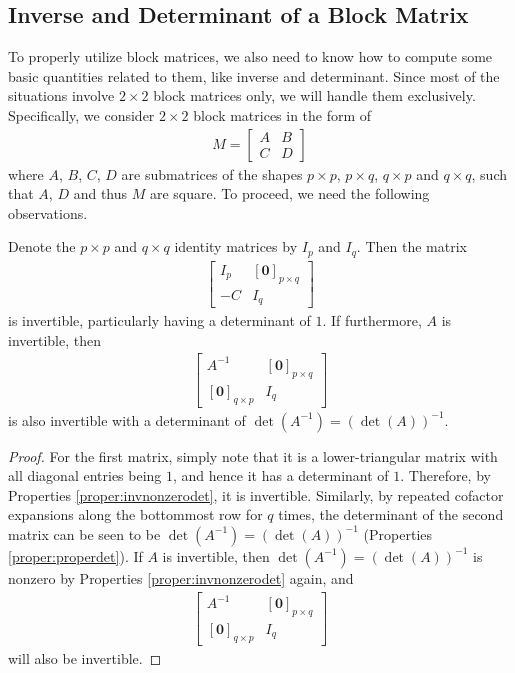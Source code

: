 \subsection{Inverse and Determinant of a Block Matrix}
To properly utilize block matrices, we also need to know how to compute some basic quantities related to them, like inverse and determinant. Since most of the situations involve $2 \times 2$ block matrices only, we will handle them exclusively. Specifically, we consider $2 \times 2$ block matrices in the form of
\begin{align*}
M = \begin{bmatrix}
A & B \\
C & D
\end{bmatrix}
\end{align*}
where $A$, $B$, $C$, $D$ are submatrices of the shapes $p \times p$, $p \times q$, $q \times p$ and $q \times q$, such that $A$, $D$ and thus $M$ are square. To proceed, we need the following observations.
\begin{proper}
\label{proper:blockmatinv}
Denote the $p \times p$ and $q \times q$ identity matrices by $I_p$ and $I_q$. Then the matrix
\begin{align*}
\begin{bmatrix}
I_p & [\textbf{0}]_{p \times q} \\
-C & I_q
\end{bmatrix}
\end{align*}
is invertible, particularly having a determinant of $1$. If furthermore, $A$ is invertible, then
\begin{align*}
\begin{bmatrix}
A^{-1} & [\textbf{0}]_{p\times q} \\
[\textbf{0}]_{q\times p} & I_q
\end{bmatrix}
\end{align*}
is also invertible with a determinant of $\det(A^{-1}) = (\det(A))^{-1}$.
\end{proper}
\begin{proof}
For the first matrix, simply note that it is a lower-triangular matrix with all diagonal entries being $1$, and hence it has a determinant of $1$. Therefore, by Properties \ref{proper:invnonzerodet}, it is invertible. Similarly, by repeated cofactor expansions along the bottommost row for $q$ times, the determinant of the second matrix can be seen to be $\det(A^{-1}) = (\det(A))^{-1}$ (Properties \ref{proper:properdet}). If $A$ is invertible, then $\det(A^{-1}) = (\det(A))^{-1}$ is nonzero by Properties \ref{proper:invnonzerodet} again, and 
\begin{align*}
\begin{bmatrix}
A^{-1} & [\textbf{0}]_{p\times q} \\
[\textbf{0}]_{q\times p} & I_q
\end{bmatrix}    
\end{align*}
will also be invertible.
\end{proof}
